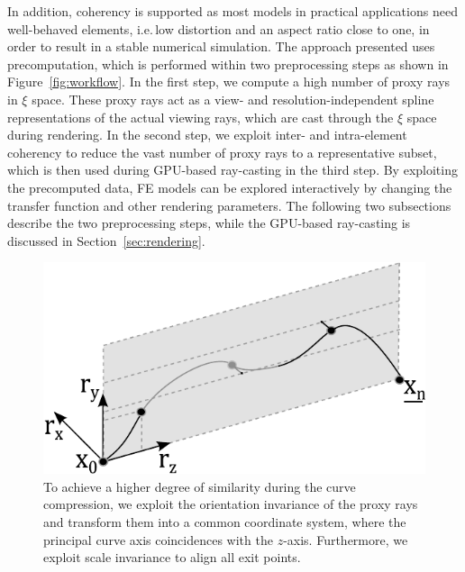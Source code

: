\documentclass[journal]{vgtc}                %
\begin{document}
In addition, coherency is supported as most models in practical applications need well-behaved elements, i.e.\,low distortion and an aspect ratio close to one, in order to result in a stable numerical simulation. The approach presented uses precomputation, which is performed within two preprocessing steps as shown in Figure~\ref{fig:workflow}. In the first step, we compute a high number of proxy rays in $\xi$ space. These proxy rays act as a view- and resolution-independent spline representations of the actual viewing rays, which are cast through the $\xi$ space during rendering. In the second step, we exploit inter- and intra-element coherency to reduce the vast number of proxy rays to a representative subset, which is then used during GPU-based ray-casting in the third step. By exploiting the precomputed data, FE models can be explored interactively by changing the transfer function and other rendering parameters. The following two subsections describe the two preprocessing steps, while the GPU-based ray-casting is discussed in Section~\ref{sec:rendering}.
%
\begin{figure}[b]
	\centering
	\includegraphics[width=0.75\linewidth]{figures/splinetransformation_new}
	\caption{To achieve a higher degree of similarity during the curve compression, we exploit the orientation invariance of the proxy rays and transform them into a common coordinate system, where the principal curve axis coincidences with the $z$-axis. Furthermore, we exploit scale invariance to align all exit points.}
	\label{fig:proxyrayalignment}
\end{figure}
%
%
%
\end{document}
